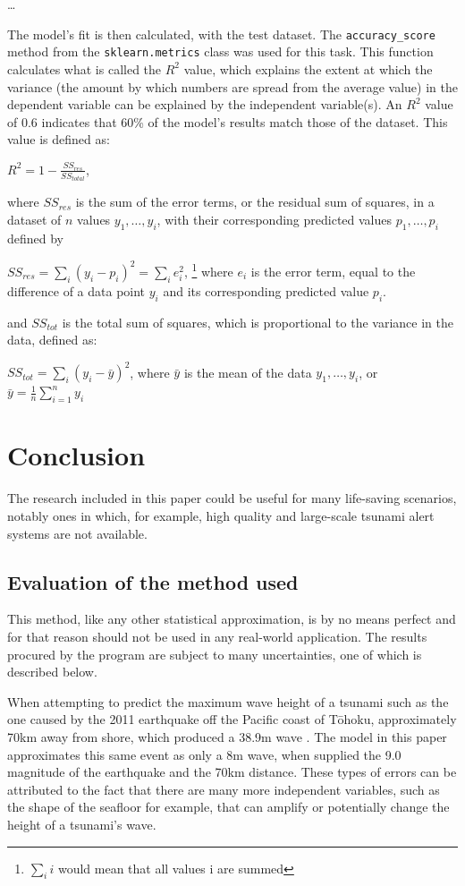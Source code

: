 \documentclass[11pt,letterpaper]{article}
\begin{document}
\dots

The model's fit is then calculated, with the test dataset. The \verb|accuracy_score| method 
from the \verb|sklearn.metrics| class was used for this task. This function calculates what 
is called the $R^2$ value, which explains the extent at which the variance (the amount by which numbers 
are spread from the average value) in the dependent variable can be explained by the independent 
variable(s). An $R^2$ value of 0.6 indicates that 60\% of the model's results match those of the 
dataset. This value is defined as: 

$R^2 = 1 - \frac{SS_{res}}{SS_{total}}$,

where $SS_{res}$ is the sum of the error terms, or the residual sum of squares, in a dataset of $n$ 
values $y_1,\dots, y_i$, with their corresponding predicted values $p_1,\dots, p_i$ defined by 

$SS_{res} = \sum_{i} (y_i - p_i)^2 = \sum_{i} e_i^2$, \footnote{$\sum_i i$ would mean that all values i 
are summed} where $e_i$ is the error term, equal to the difference of a data point $y_i$ 
and its corresponding predicted value $p_i$.

and $SS_{tot}$ is the total sum of squares, which is proportional to the variance in the data, 
defined as:

$SS_{tot} = \sum_{i} (y_i - \bar y)^2$, where $\bar y$ is the mean of the data $y_1,\dots, y_i$, 
or $\bar y = \frac{1}{n} \sum_{i=1}^n y_i$

\section{Conclusion}

The research included in this paper could be useful for many life-saving scenarios,
notably ones in which, for example, high quality and large-scale tsunami alert
systems are not available.

\subsection{Evaluation of the method used}

This method, like any other statistical approximation, is by no means perfect
and for that reason should not be used in any real-world application. The results
procured by the program are subject to many uncertainties, one of which is described
below.

When attempting to predict the maximum wave height of a tsunami such as the one
caused by the 2011 earthquake off the Pacific coast of Tōhoku, approximately 70km
away from shore, which produced a 38.9m wave \cite{yomiuri_2011}. The model in this
paper approximates this same event as only a 8m wave, when supplied the 9.0 magnitude
of the earthquake and the 70km distance. These types of errors can be attributed to the
fact that there are many more independent variables, such as the shape of the seafloor for
example, that can amplify or potentially change the height of a tsunami's wave.
\end{document}
